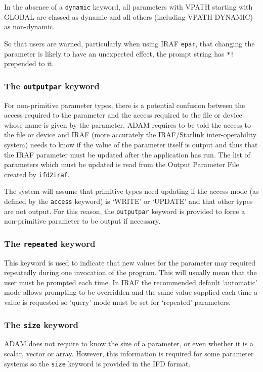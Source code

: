 \documentclass[twoside,11pt]{article}
\newcommand{\htmlref}[2]{#1}
\newcommand{\xlabel}[1]{}
\begin{document}
In the absence of a
\htmlref{\texttt{dynamic}}{dynamic}
keyword, all parameters with VPATH starting with GLOBAL are classed as
dynamic and all others (including VPATH DYNAMIC) as non-dynamic.

So that users are warned, particularly when using IRAF \texttt{epar}, that
changing the parameter is likely to have an unexpected effect, the prompt
string has \texttt{*!} prepended to it.

\subsubsection{\xlabel{the_outputpar_keyword}\label{outputpar_key}The
\texttt{outputpar} keyword}
For non-primitive parameter types, there is a potential confusion between the
access required to the parameter and the access required to the file
or device whose name is given by the parameter. ADAM requires to be
told the access to the file or device and IRAF (more accurately the
IRAF/Starlink inter-operability system) needs to know if the value of
the parameter itself is output and thus that the IRAF parameter must
be updated after the application has run.
The list of parameters which must be updated is read from the Output Parameter
File created by \texttt{ifd2iraf}.

The system will assume that primitive types need updating if the access
mode (as defined by the
\htmlref{\texttt{access}}{access}
keyword) is `WRITE' or `UPDATE' and that other types are not output.
For this reason, the
\htmlref{\texttt{outputpar}}{outputpar}
keyword is provided to force a non-primitive parameter to be output if
necessary.

\subsubsection{\xlabel{the_repeated_keyword}\label{repeated_key}The
\texttt{repeated} keyword}
This keyword is used to indicate that new values for the parameter may
required repeatedly during one invocation of the program.
This will usually mean that the user must be prompted each time. In IRAF the
recommended default `automatic' mode allows prompting to be overridden and the
same value supplied each time a value is requested so `query' mode must be set
for `repeated' parameters.

\subsubsection{\xlabel{the_size_keyword}\label{size_key}The \texttt{size}
keyword}
ADAM does not require to know the size of a parameter, or even whether it is
a scalar, vector or array.  However, this information is required for some
parameter systems so the
\htmlref{\texttt{size}}{size}
keyword is provided in the IFD format.
\end{document}
